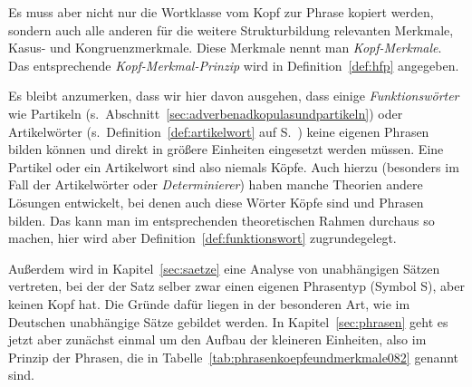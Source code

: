 Es muss aber nicht nur die Wortklasse vom Kopf zur Phrase kopiert werden, sondern auch alle anderen für die weitere Strukturbildung relevanten Merkmale, \zB Kasus- und Kongruenzmerkmale.
Diese Merkmale nennt man \textit{Kopf-Merkmale}.
Das entsprechende \textit{Kopf-Merkmal-Prinzip} wird in Definition~\ref{def:hfp} angegeben.


Es bleibt anzumerken, dass wir hier davon ausgehen, dass einige \textit{Funktionswörter} wie Partikeln (s.\ Abschnitt~\ref{sec:adverbenadkopulasundpartikeln}) oder Artikelwörter (s.\ Definition~\ref{def:artikelwort} auf S.~\pageref{def:artikelwort}) keine eigenen Phrasen bilden können und direkt in größere Einheiten eingesetzt werden müssen.
Eine Partikel oder ein Artikelwort sind also niemals Köpfe.
Auch hierzu (besonders im Fall der Artikelwörter oder \textit{Determinierer}) haben manche Theorien andere Lösungen entwickelt, bei denen auch diese Wörter Köpfe sind und Phrasen bilden.
Das kann man im entsprechenden theoretischen Rahmen durchaus so machen, hier wird aber Definition~\ref{def:funktionswort} zugrundegelegt.


Außerdem wird in Kapitel~\ref{sec:saetze} eine Analyse von unabhängigen Sätzen vertreten, bei der der Satz selber zwar einen eigenen Phrasentyp (\zB Symbol S), aber keinen Kopf hat.
Die Gründe dafür liegen in der besonderen Art, wie im Deutschen unabhängige Sätze gebildet werden.
In Kapitel~\ref{sec:phrasen} geht es jetzt aber zunächst einmal um den Aufbau der kleineren Einheiten, also im Prinzip der Phrasen, die in Tabelle~\ref{tab:phrasenkoepfeundmerkmale082} genannt sind.


